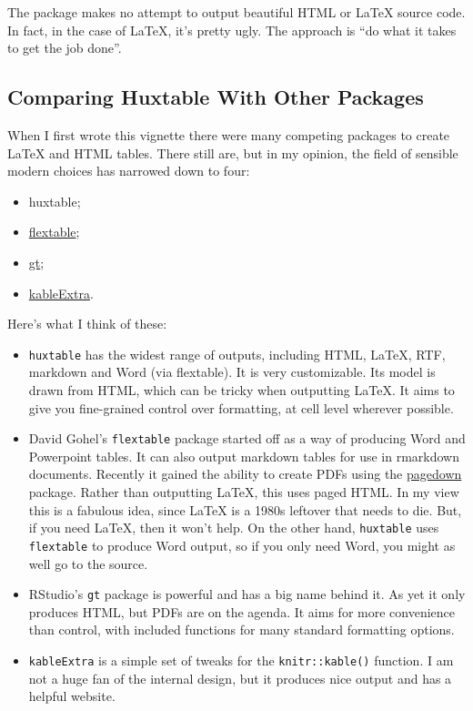 \documentclass[]{article}
\providecommand{\tightlist}{%
  \setlength{\itemsep}{0pt}\setlength{\parskip}{0pt}}
\begin{document}
The package makes no attempt to output beautiful HTML or LaTeX source
code. In fact, in the case of LaTeX, it's pretty ugly. The approach is
``do what it takes to get the job done''.

\hypertarget{comparing-huxtable-with-other-packages}{%
\subsection{Comparing Huxtable With Other
Packages}\label{comparing-huxtable-with-other-packages}}

When I first wrote this vignette there were many competing packages to
create LaTeX and HTML tables. There still are, but in my opinion, the
field of sensible modern choices has narrowed down to four:

\begin{itemize}
\tightlist
\item
  huxtable;
\item
  \href{https://davidgohel.github.io/flextable/index.html}{flextable};
\item
  \href{https://gt.rstudio.com/}{gt};
\item
  \href{https://haozhu233.github.io/kableExtra/}{kableExtra}.
\end{itemize}

Here's what I think of these:

\begin{itemize}
\tightlist
\item
  \texttt{huxtable} has the widest range of outputs, including HTML,
  LaTeX, RTF, markdown and Word (via flextable). It is very
  customizable. Its model is drawn from HTML, which can be tricky when
  outputting LaTeX. It aims to give you fine-grained control over
  formatting, at cell level wherever possible.
\item
  David Gohel's \texttt{flextable} package started off as a way of
  producing Word and Powerpoint tables. It can also output markdown
  tables for use in rmarkdown documents. Recently it gained the ability
  to create PDFs using the
  \href{https://github.com/rstudio/pagedown}{pagedown} package. Rather
  than outputting LaTeX, this uses paged HTML. In my view this is a
  fabulous idea, since LaTeX is a 1980s leftover that needs to die. But,
  if you need LaTeX, then it won't help. On the other hand,
  \texttt{huxtable} uses \texttt{flextable} to produce Word output, so
  if you only need Word, you might as well go to the source.
\item
  RStudio's \texttt{gt} package is powerful and has a big name behind
  it. As yet it only produces HTML, but PDFs are on the agenda. It aims
  for more convenience than control, with included functions for many
  standard formatting options.
\item
  \texttt{kableExtra} is a simple set of tweaks for the
  \texttt{knitr::kable()} function. I am not a huge fan of the internal
  design, but it produces nice output and has a helpful website.
\end{itemize}
\end{document}
